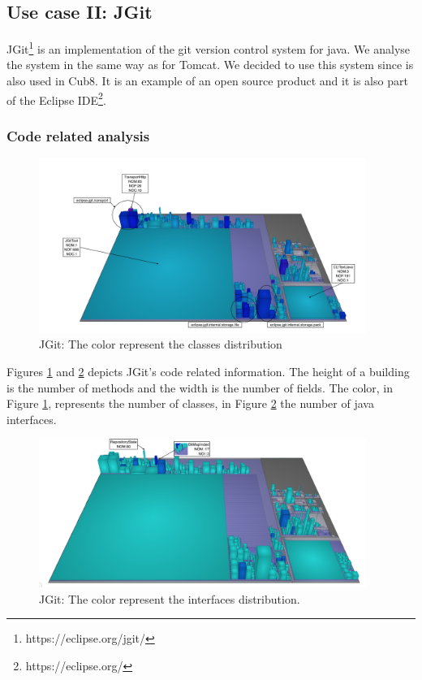 \documentclass[]{usiinfbachelorproject}
\begin{document}
\subsection{Use case II: JGit}
JGit\footnote{https://eclipse.org/jgit/} is an implementation of the git version control system for java. We analyse the system in the same way as for Tomcat. We decided to use this system since is also used in Cub8. It is an example of an open source product and it is also part of the Eclipse IDE\footnote{https://eclipse.org/}.


\subsubsection{Code related analysis}


			
\begin{figure}[H]
	\centering
	\includegraphics[width=0.95\textwidth]{images/jgitClass}
	\caption[JGit: Classes]{JGit:  The color represent the classes distribution \label{fig:jgitRel:a}}
\end{figure}





Figures \ref{fig:jgitRel:a}  and \ref{fig:jgitRel:b}  depicts JGit's code related information. The height of a building is the number of methods and the width is the number of fields. The color, in Figure \ref{fig:jgitRel:a}, represents the number of classes, in Figure \ref{fig:jgitRel:b} the number of java interfaces.


\begin{figure}[H]
	\centering
	\includegraphics[width=0.95\textwidth]{images/jgitInterface}
	\caption[Jgit: Interfaces]{JGit: The color represent the interfaces distribution. \label{fig:jgitRel:b}}
\end{figure}
\end{document}
